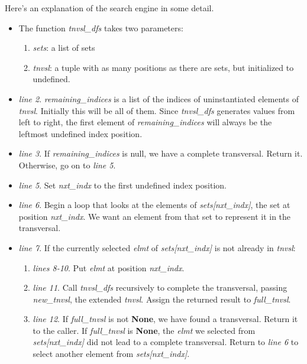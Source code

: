 Here's an explanation of the search engine in some detail.
\begin{itemize}
    \item The function \textit{tnvsl\_dfs} takes two parameters: 
        \begin{enumerate}
            \item \textit{sets}: a list of sets
            \item \textit{tnvsl}: a tuple with as many positions as there are sets, but initialized to undefined.
        \end{enumerate}
    \item \textit{line 2}. \textit{remaining\_indices} is a list of the indices of uninstantiated elements of \textit{tnvsl}. Initially this will be all of them. Since \textit{tnvsl\_dfs} generates values from left to right, the first element of \textit{remaining\_indices} will always be the leftmost undefined index position.
    \item \textit{line 3}. If \textit{remaining\_indices} is null, we have a complete transversal. Return it. Otherwise, go on to \textit{line 5}.
    \item \textit{line 5}. Set \textit{nxt\_indx} to the first undefined index position.
    \item \textit{line 6}. Begin a loop that looks at the elements of \textit{sets[nxt\_indx]}, the set at position  \textit{nxt\_indx}. We want an element from that set to represent it in the transversal.
    \item \textit{line 7}. If the currently selected \textit{elmt} of \textit{sets[nxt\_indx]} is not already in \textit{tnvsl}:
    \begin{enumerate}
        \item \textit{lines 8-10}. Put \textit{elmt} at position \textit{nxt\_indx}.
        \item \textit{line 11}. Call \textit{tnvsl\_dfs} recursively to complete the transversal, passing \textit{new\_tnvsl}, the extended \textit{tnvsl}. Assign the returned result to \textit{full\_tnvsl}.
        \item \textit{line 12}. If \textit{full\_tnvsl} is not \textbf{None}, we have found a transversal. Return it to the caller. If \textit{full\_tnvsl} is \textbf{None}, the \textit{elmt} we selected from \textit{sets[nxt\_indx]} did not lead to a complete transversal. Return to \textit{line 6} to select another element from \textit{ sets[nxt\_indx]}.
    \end{enumerate}
\end{itemize}

